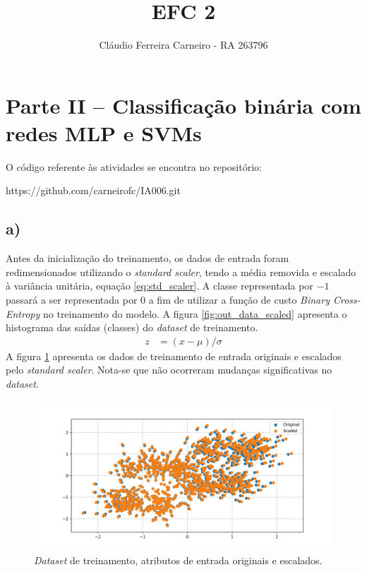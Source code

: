 \documentclass{article}
\author{Cláudio Ferreira Carneiro - RA 263796}
\title{EFC 2}
\begin{document}
    \maketitle
    \newpage
    \section[]{Parte II – Classificação binária com redes MLP e SVMs}
    O código referente às atividades se encontra no repositório:
    
    https://github.com/carneirofc/IA006.git\linebreak
    \subsection*{a)} Antes da inicialização do treinamento,
    os dados de entrada foram redimensionados utilizando o \textit{standard scaler},
    tendo a média removida e escalado à variância unitária, equação \ref{eq:std_scaler}.
    A classe representada por $-1$ passará a ser representada por $0$ a fim de utilizar a
    função de custo \textit{Binary Cross-Entropy} no treinamento do modelo. A figura \ref{fig:out_data_scaled}
    apresenta o histograma das saídas (classes) do \textit{dataset} de treinamento.
    \begin{align}
        z &= (x - \mu) / \sigma
        \label{eq:std_scaler}
    \end{align}
    A figura \ref{fig:inp_data_scaled} apresenta os dados de treinamento de entrada originais e 
    escalados pelo \textit{standard scaler}. Nota-se que não ocorreram mudanças significativas
    no \textit{dataset}.
    \begin{figure}[H]
        \centering
        \includegraphics[width=\linewidth]{mlp_inp_scaled.png}   
        \caption{\textit{Dataset} de treinamento, atributos de entrada
            originais e escalados.}
        \label{fig:inp_data_scaled}
    \end{figure}
    
\end{document}

